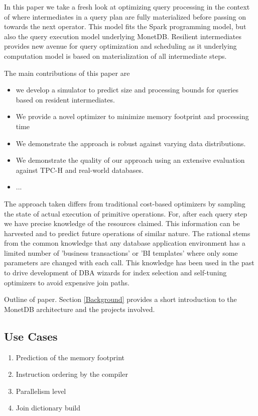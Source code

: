 In this paper we take a fresh look at optimizing query processing in the context
of where intermediates in a query plan are fully materialized before passing on
towards the next operator. This model fits the Spark programming model,
but also the query execution model underlying MonetDB.
Resilient intermediates provides new avenue for query optimization and
scheduling as it underlying computation model is based on
materialization of all intermediate steps.

The main contributions of this paper are
\begin{itemize}
	\item we develop a simulator to predict size and processing bounds for queries based on resident intermediates.
	\item We provide a novel optimizer to minimize memory footprint and processing time
	\item We demonstrate the approach is robust against varying data distributions.
	\item We demonstrate the quality of our approach using an extensive evaluation against TPC-H and real-world databases.
	\item ...
\end{itemize}

The approach taken differs from traditional cost-based optimizers by sampling
the state of actual execution of primitive operations.
For, after each query step we have precise knowledge of the resources claimed.
This information can be harvested and to predict future operations of similar nature.
The rational stems from the common knowledge that any database application
environment has a limited number of 'business transactions' or 'BI templates'
where only some parameters are changed with each call.
This knowledge has been used in the past to drive development of DBA
wizards \cite{microsoft} for index selection and self-tuning optimizers
\cite{IBM} to avoid expensive join paths.

Outline of paper. Section \ref{Background} provides a short introduction
to the MonetDB architecture and the projects involved.

\subsection{Use Cases}
\begin{enumerate}
  \item Prediction of the memory footprint
  \item Instruction ordering by the compiler
  \item Parallelism level
  \item Join dictionary build
\end{enumerate}
